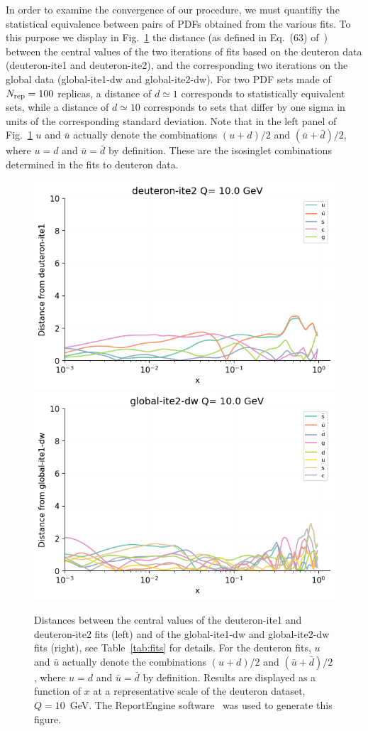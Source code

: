 \documentclass[11pt,a4paper]{article}
\begin{document}
In order to examine the convergence of our procedure, we must quantifiy the
statistical equivalence between pairs of PDFs obtained from the various fits.
To this purpose we display in Fig.~\ref{fig:distances_convergence} the distance 
(as defined in Eq.~(63) of~\cite{Ball:2010de}) between the central values of
the two iterations of fits based on the deuteron data (deuteron-ite1 and
deuteron-ite2), and the corresponding two iterations on the global data
(global-ite1-dw and global-ite2-dw). For two PDF sets made of $N_{\rm rep}=100$
replicas, a distance of $d\simeq 1$ corresponds to statistically equivalent
sets, while a distance of $d\simeq 10$ corresponds to sets that differ by one
sigma in units of the corresponding standard deviation. Note that in the left
panel of Fig.~\ref{fig:distances_convergence} $u$ and $\bar u$ actually denote
the combinations $(u+d)/2$ and $(\bar u+\bar d)/2$, where $u=d$ and
$\bar u=\bar d$ by definition. These are the isosinglet combinations determined
in the fits to deuteron data.

\begin{figure}[!t]
\centering
\includegraphics[width=0.49\linewidth]{plots/convergence_dist_1.png}
\includegraphics[width=0.49\linewidth]{plots/convergence_dist_2.png}
\caption{Distances between the central values of the deuteron-ite1 and
  deuteron-ite2 fits (left) and of the global-ite1-dw and global-ite2-dw fits
  (right), see Table~\ref{tab:fits} for details. For the deuteron fits, $u$
  and $\bar u$ actually denote the combinations $(u+d)/2$ and
  $(\bar u+\bar d)/2$, where $u=d$ and $\bar u=\bar d$ by definition.
  Results are displayed as a
  function of $x$ at a representative scale of the deuteron dataset,
  $Q=10$~GeV. The {\sc ReportEngine}
  software~\cite{zahari_kassabov_2019_2571601} was used to generate this
  figure.}
\label{fig:distances_convergence}
\end{figure}
\end{document}
